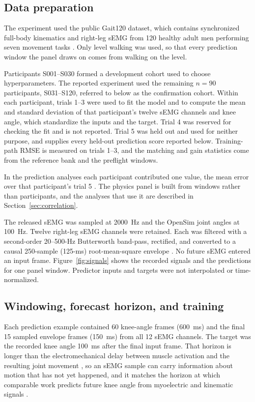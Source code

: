\documentclass[referee,lineno,pdflatex,sn-vancouver-num]{sn-jnl}
\begin{document}
\subsection{Data preparation}

The experiment used the public Gait120 dataset, which contains synchronized
full-body kinematics and right-leg sEMG from 120 healthy adult men performing
seven movement tasks \cite{boo2025,boo2025dataset}. Only level walking was used, so
that every prediction window the panel draws on comes from walking on the
level.

Participants S001--S030 formed a development cohort used to choose
hyperparameters. The reported experiment used the remaining
$n=90$ participants, S031--S120, referred to below
as the confirmation cohort. Within each
participant, trials 1--3 were used to fit the model and to compute the mean and
standard deviation of that participant's twelve sEMG channels and knee angle,
which standardize the inputs and the target. Trial 4 was reserved for checking
the fit and is not reported. Trial 5 was held out and used
for neither purpose, and supplies every held-out prediction score reported
below. Training-path RMSE is measured on trials 1--3, and the matching and gain
statistics come from the reference bank and the preflight windows.

In the prediction analyses each participant contributed one value, the mean
error over that participant's trial 5 \cite{roberts2017}. The physics panel is
built from windows rather than participants, and the analyses that use it are
described in Section~\ref{sec:correlation}.

The released sEMG was sampled at 2000~Hz and the OpenSim joint angles at 100~Hz.
Twelve right-leg sEMG channels were retained. Each was filtered with
a second-order 20--500-Hz Butterworth band-pass, rectified, and converted to a
causal 250-sample (125-ms) root-mean-square envelope
\cite{chowdhury2013,phinyomark2018}. No future sEMG entered an input frame. Figure~\ref{fig:signals} shows the
recorded signals and the predictions for one panel window.
Predictor inputs and targets were not interpolated or time-normalized.

\subsection{Windowing, forecast horizon, and training}

Each prediction example contained 60 knee-angle frames (600~ms) and the final 15
sampled envelope frames (150~ms) from all 12 sEMG channels. The target was the
recorded knee angle 100~ms after the final input frame. That horizon is longer
than the electromechanical delay between muscle activation and the resulting
joint movement \cite{cavanagh1979}, so an sEMG sample can carry information
about motion that has not yet happened, and it matches the horizon at which
comparable work predicts future knee angle from myoelectric and kinematic
signals \cite{coker2021}.
\end{document}
